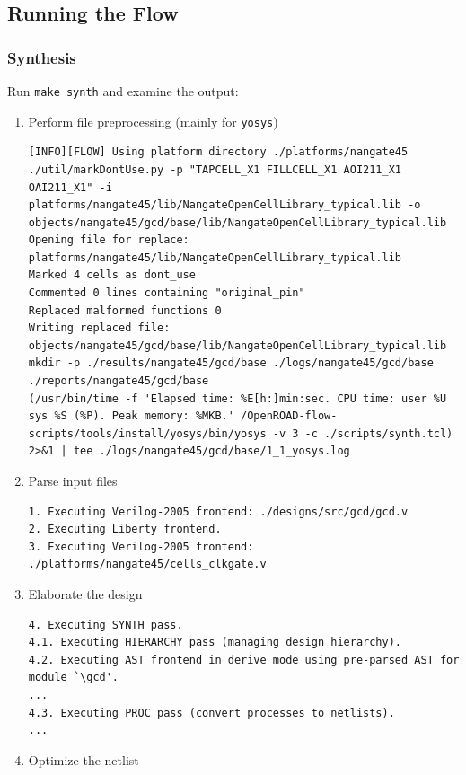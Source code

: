 \documentclass[a4paper,12pt,twoside]{article}
\begin{document}
\subsection{Running the Flow}\label{SRF}
\subsubsection{Synthesis}
Run \texttt{make synth} and examine the output:
\begin{enumerate}
    \item Perform file preprocessing (mainly for \texttt{yosys})
    \begin{verbatim}
[INFO][FLOW] Using platform directory ./platforms/nangate45
./util/markDontUse.py -p "TAPCELL_X1 FILLCELL_X1 AOI211_X1 OAI211_X1" -i platforms/nangate45/lib/NangateOpenCellLibrary_typical.lib -o objects/nangate45/gcd/base/lib/NangateOpenCellLibrary_typical.lib
Opening file for replace: platforms/nangate45/lib/NangateOpenCellLibrary_typical.lib
Marked 4 cells as dont_use
Commented 0 lines containing "original_pin"
Replaced malformed functions 0
Writing replaced file: objects/nangate45/gcd/base/lib/NangateOpenCellLibrary_typical.lib
mkdir -p ./results/nangate45/gcd/base ./logs/nangate45/gcd/base ./reports/nangate45/gcd/base
(/usr/bin/time -f 'Elapsed time: %E[h:]min:sec. CPU time: user %U sys %S (%P). Peak memory: %MKB.' /OpenROAD-flow-scripts/tools/install/yosys/bin/yosys -v 3 -c ./scripts/synth.tcl) 2>&1 | tee ./logs/nangate45/gcd/base/1_1_yosys.log
    \end{verbatim}
    \item Parse input files
    \begin{verbatim}
1. Executing Verilog-2005 frontend: ./designs/src/gcd/gcd.v
2. Executing Liberty frontend.
3. Executing Verilog-2005 frontend: ./platforms/nangate45/cells_clkgate.v
    \end{verbatim}
    \item Elaborate the design
    \begin{verbatim}
4. Executing SYNTH pass.
4.1. Executing HIERARCHY pass (managing design hierarchy).
4.2. Executing AST frontend in derive mode using pre-parsed AST for module `\gcd'.
...
4.3. Executing PROC pass (convert processes to netlists).
...
    \end{verbatim}
    \item Optimize the netlist
    \begin{verbatim}

\end{verbatim}
\end{enumerate}
\end{document}
